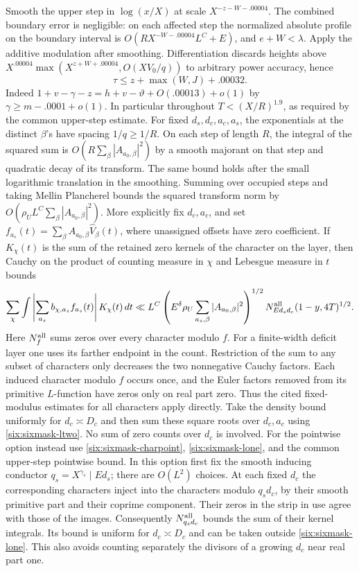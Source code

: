 \documentclass[11pt,a4paper]{article}
\theoremstyle{paperplain}
\numberwithin{equation}{section}
\begin{document}
Smooth the upper step in $\log(x/X)$ at scale
$X^{-z-W-.00004}$. The combined boundary error is negligible:
on each affected step the normalized absolute profile on the
boundary interval is $O(RX^{-W-.00004}L^C+E)$, and $e+W<\lambda$.
Apply the additive modulation after smoothing. Differentiation
discards heights above $X^{.00004}\max(X^{z+W+.00004},O(XV_0/q))$
to arbitrary power accuracy, hence
\[
 \tau\le z+\max(W,J)+.00032 .
\]
Indeed $1+v-\gamma-z=h+v-\vartheta+O(.00013)+o(1)$ by
$\gamma\ge m-.0001+o(1)$. In particular throughout
$T<(X/R)^{1.9}$, as required by the common upper-step estimate.
For fixed $d_s,d_c,a_c,a_s$, the exponentials at the distinct
$\beta$'s have spacing $1/q\ge1/R$. On each step of length $R$,
the integral of the squared sum is
$O(R\sum_\beta|A_{a_0,\beta}|^2)$ by a smooth majorant on that
step and quadratic decay of its transform. The same bound holds
after the small logarithmic translation in the smoothing.
Summing over occupied steps and taking Mellin Plancherel bounds
the squared transform norm by $O(\rho_U L^C\sum_\beta|A_{a_0,\beta}|^2)$.
More explicitly fix $d_c,a_c$, and set
$f_{a_s}(t)=\sum_\beta A_{a_0,\beta}\widehat V_\beta(t)$, where
unassigned offsets have zero coefficient. If $K_\chi(t)$ is the
sum of the retained zero kernels of the character on the layer, then
Cauchy on the product of counting measure in $\chi$ and Lebesgue
measure in $t$ bounds
\[
 \sum_{\chi}\int
  \left|\sum_{a_s} b_{\chi,a_s}f_{a_s}(t)\right|K_\chi(t)\,dt
 \ll L^C \left(E^\delta\rho_U
     \sum_{a_s,\beta}|A_{a_0,\beta}|^2\right)^{1/2}
      N_{Ed_sd_c}^{\rm all}(1-y,4T)^{1/2}.
\]
Here $N_f^{\rm all}$ sums zeros over every character modulo $f$.
For a finite-width deficit layer one uses its farther endpoint in
the count. Restriction of the sum to any subset of characters only
decreases the two nonnegative Cauchy factors. Each induced
character modulo $f$ occurs once, and the Euler factors removed
from its primitive $L$-function have zeros only on real part zero.
Thus the cited fixed-modulus estimates for all characters apply
directly. Take the density bound uniformly for $d_c\asymp D_c$
and then sum these square roots over $d_c,a_c$ using
\eqref{six:sixmask-ltwo}. No sum of zero counts over $d_c$ is involved.
For the pointwise option instead use \eqref{six:sixmask-charpoint},
\eqref{six:sixmask-lone}, and the common upper-step pointwise bound.
In this option first fix the smooth inducing conductor
$q_s=X^{\gamma_s}\mid Ed_s$; there are $O(L^2)$ choices. At each fixed
$d_c$ the corresponding characters inject into the characters modulo
$q_s d_c$, by their smooth primitive part and their coprime component.
Their zeros in the strip in use agree with those of the images.
Consequently $N_{q_sd_c}^{\rm all}$ bounds the sum of their kernel
integrals. Its bound is uniform for $d_c\asymp D_c$ and can be taken
outside \eqref{six:sixmask-lone}. This also avoids counting separately
the divisors of a growing $d_c$ near real part one.
\end{document}
